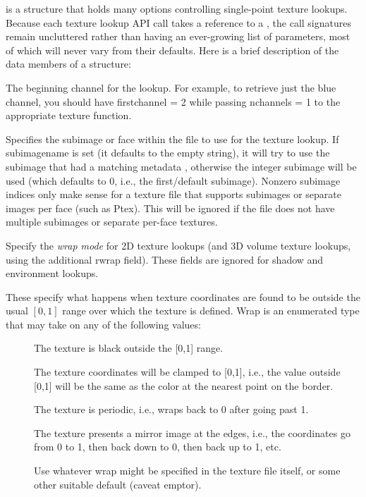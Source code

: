 \TextureOpt is a structure that holds many options controlling
single-point texture lookups.  Because each texture lookup API call takes
a reference to a \TextureOpt, the call signatures remain uncluttered
rather than having an ever-growing list of parameters, most of which
will never vary from their defaults.  Here is a brief description of
the data members of a \TextureOpt structure:

The beginning channel for the lookup.  For example, to retrieve just the blue
channel, you should have {\cf firstchannel} = 2 while passing {\cf nchannels} = 1
to the appropriate texture function.
\apiend

Specifies the subimage or face within the file to use for the texture lookup.
If {\cf subimagename} is set (it defaults to the empty string), it will
try to use the subimage that had a matching metadata
, otherwise the integer {\cf subimage} will be
used (which defaults to 0, i.e., the first/default subimage).  Nonzero
subimage indices only make sense for a texture file that supports
subimages or separate images per face (such as Ptex).  This will be
ignored if the file does not have multiple subimages or separate
per-face textures.
\apiend

Specify the \emph{wrap mode} for 2D texture lookups (and 3D volume
texture lookups, using the additional {\cf rwrap} field).  These fields
are ignored for shadow and environment lookups.

These specify what happens when texture coordinates are found to be
outside the usual $[0,1]$ range over which the texture is defined.
{\cf Wrap} is an enumerated type that may take on any of the
following values:
\begin{description}
\item[\spc] \spc
\item[\rm {}] The texture is black outside the [0,1] range.
\item[\rm {}] The texture coordinates will be clamped to
  [0,1], i.e., the value outside [0,1] will be the same as the color
  at the nearest point on the border.
\item[\rm {}] The texture is periodic, i.e., wraps back
  to 0 after going past 1.
\item[\rm {}] The texture presents a mirror image at the
  edges, i.e., the coordinates go from 0 to 1, then back down to 0, then
  back up to 1, etc.
\item[\rm {}] Use whatever wrap might be specified in the
  texture file itself, or some other suitable default (caveat emptor).
\end{description}

